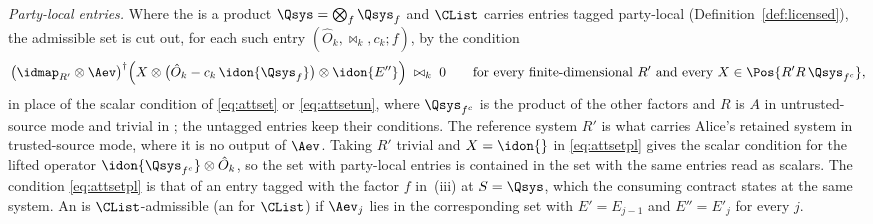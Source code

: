 \begin{definition}
\emph{Party-local entries.} Where the  is a product
$\Qsys=\bigotimes_f\Qsys_f$ and $\CList$ carries entries tagged party-local
(Definition~\ref{def:licensed}), the admissible set is cut out, for each such
entry $(\hat O_k,\bowtie_k,c_k;f)$, by the condition
\begin{equation}\label{eq:attsetpl}
  \big(\idmap_{R'}\otimes\Aev\big)^{\dagger}
  \Big(X\otimes\big(\hat O_k-c_k\,\idon{\Qsys_f}\big)\otimes\idon{E''}\Big)
  \;\bowtie_k\;0
  \qquad\text{for every finite-dimensional }R'\text{ and every }
  X\in\Pos{R'R\,\Qsys_{f^c}} ,
\end{equation}
in place of the scalar condition of \eqref{eq:attset} or
\eqref{eq:attsetun}, where $\Qsys_{f^c}$ is the product of the other
factors and $R$ is $A$ in untrusted-source mode and trivial in
; the untagged entries keep their conditions. The
reference system $R'$ is what carries Alice's retained system in
trusted-source mode, where it is no output of $\Aev$. Taking $R'$ trivial
and $X=\idon{}$ in \eqref{eq:attsetpl} gives the scalar condition for the
lifted operator $\idon{\Qsys_{f^c}}\otimes\hat O_k$, so the set with
party-local entries is contained in the set with the same entries read as
scalars. The condition \eqref{eq:attsetpl} is that of an entry tagged with the
factor $f$ in \,(iii) at $S=\Qsys$, which the
consuming contract states at the same system. An  is
$\CList$-admissible (an  for $\CList$) if
$\Aev_j$ lies in the corresponding set with
$E'=E_{j-1}$ and $E''=E'_j$ for every $j$.
\end{definition}
